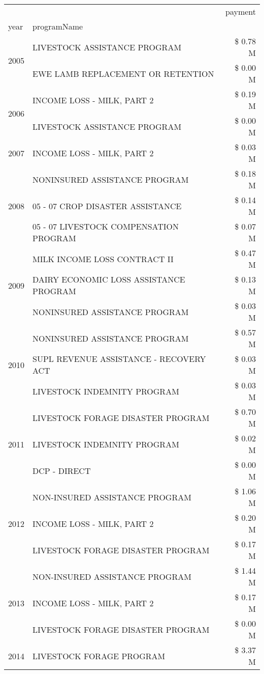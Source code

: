 \begin{tabular}{llr}
\toprule
 &  & payment \\
year & programName &  \\
\midrule
\multirow[t]{2}{*}{2005} & LIVESTOCK ASSISTANCE PROGRAM & \$ 0.78 M \\
 & EWE LAMB REPLACEMENT OR RETENTION & \$ 0.00 M \\
\cline{1-3}
\multirow[t]{2}{*}{2006} & INCOME LOSS - MILK, PART 2 & \$ 0.19 M \\
 & LIVESTOCK ASSISTANCE PROGRAM & \$ 0.00 M \\
\cline{1-3}
2007 & INCOME LOSS - MILK, PART 2 & \$ 0.03 M \\
\cline{1-3}
\multirow[t]{3}{*}{2008} & NONINSURED ASSISTANCE PROGRAM & \$ 0.18 M \\
 & 05 - 07 CROP DISASTER ASSISTANCE & \$ 0.14 M \\
 & 05 - 07 LIVESTOCK COMPENSATION PROGRAM & \$ 0.07 M \\
\cline{1-3}
\multirow[t]{3}{*}{2009} & MILK INCOME LOSS CONTRACT II & \$ 0.47 M \\
 & DAIRY ECONOMIC LOSS ASSISTANCE PROGRAM & \$ 0.13 M \\
 & NONINSURED ASSISTANCE PROGRAM & \$ 0.03 M \\
\cline{1-3}
\multirow[t]{3}{*}{2010} & NONINSURED ASSISTANCE PROGRAM & \$ 0.57 M \\
 & SUPL REVENUE ASSISTANCE - RECOVERY ACT & \$ 0.03 M \\
 & LIVESTOCK INDEMNITY PROGRAM & \$ 0.03 M \\
\cline{1-3}
\multirow[t]{3}{*}{2011} & LIVESTOCK FORAGE DISASTER PROGRAM & \$ 0.70 M \\
 & LIVESTOCK INDEMNITY PROGRAM & \$ 0.02 M \\
 & DCP - DIRECT & \$ 0.00 M \\
\cline{1-3}
\multirow[t]{3}{*}{2012} & NON-INSURED ASSISTANCE PROGRAM & \$ 1.06 M \\
 & INCOME LOSS - MILK, PART 2 & \$ 0.20 M \\
 & LIVESTOCK FORAGE DISASTER PROGRAM & \$ 0.17 M \\
\cline{1-3}
\multirow[t]{3}{*}{2013} & NON-INSURED ASSISTANCE PROGRAM & \$ 1.44 M \\
 & INCOME LOSS - MILK, PART 2 & \$ 0.17 M \\
 & LIVESTOCK FORAGE DISASTER PROGRAM & \$ 0.00 M \\
\cline{1-3}
\multirow[t]{3}{*}{2014} & LIVESTOCK FORAGE PROGRAM & \$ 3.37 M \\

\end{tabular}
